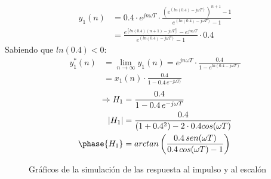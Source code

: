 \documentclass[../../guia1.tex]{subfiles}
\begin{document}
\begin{align*}
	y_1(n) &= 0.4\cdot e^{jn\omega T}\cdot \frac{\left({e^{(ln(0.4)-j\omega T)}}\right)^{n+1}-1}{e^{(ln(0.4)-j\omega T)}-1}\\
		&= \frac{e^{[ln(0.4)(n+1)-j\omega T]} - e^{jn\omega T}}{e^{(ln(0.4)-j\omega T)}-1}\cdot 0.4
\end{align*}
Sabiendo que $ln(0.4) < 0$:
\begin{align*}
	y_1^*(n) &= \lim_{n\rightarrow \infty} y_1(n) = e^{jn\omega T}\cdot \frac{0.4}{1-e^{ln(0.4 - j\omega T)}}\\
			&= x_1(n)\cdot  \frac{0.4}{1-0.4 \,e^{- j\omega T)}}
\end{align*}
\begin{align*}
	\Rightarrow H_1 &= \frac{0.4}{1-0.4\,e^{-j\omega T}}\\
	|H_1| &= \frac{0.4}{(1+0.4^2)-2\cdot 0.4 cos(\omega T)}\\
	\phase{H_1} &= arctan\left( \frac{0.4\, sen(\omega T)}{0.4\, cos(\omega T) - 1} \right)
\end{align*}

\begin{figure}[H]
 \centering

 \caption{Gráficos de la simulación de las respuesta al impulso y al escalón}
 \label{f:eja}
\end{figure}
\end{document}

